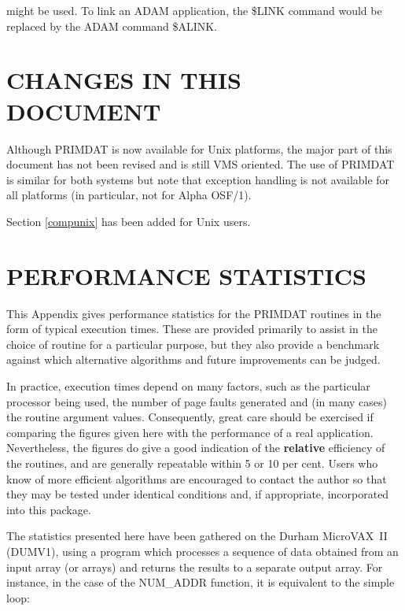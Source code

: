 \documentclass[11pt,nolof]{starlink}
\providecommand{\name}[1]{#1}
\begin{document}

might be used.
To link an \name{ADAM} application, the \name{\$LINK} command would be
replaced by the \name{ADAM} command \name{\$ALINK}.

\section{CHANGES IN THIS DOCUMENT}
Although PRIMDAT is now available for Unix platforms, the major part of this
document has not been revised and is still VMS oriented.
The use of PRIMDAT is similar for both systems but note that exception
handling is not available for all platforms (in particular, not for
Alpha OSF/1).

Section \ref{compunix} has been added for Unix users.

\appendix

\newpage

\section{PERFORMANCE STATISTICS}

\label{appendix:statistics}

This Appendix gives performance statistics for the \name{PRIMDAT} routines
in the form of typical execution times.
These are provided primarily to assist in the choice of routine for a
particular purpose, but they also provide a benchmark against which
alternative algorithms and future improvements can be judged.

In practice, execution times depend on many factors, such as the
particular processor being used, the number of page faults generated
and (in many cases) the routine argument values.
Consequently, great care should be exercised if comparing the figures given
here with the performance of a real application.
Nevertheless, the figures do give a good indication of the \textbf{relative}
efficiency of the routines, and are generally repeatable within 5 or 10 per
cent.
Users who know of more efficient algorithms are encouraged to contact the
author so that they may be tested under identical conditions and, if
appropriate, incorporated into this package.

The statistics presented here have been gathered on the Durham
\name{MicroVAX}~II (\name{DUMV1}), using a program which processes a
sequence of data obtained from an input array (or arrays) and returns the
results to a separate output array.
For instance, in the case of the \name{NUM\_ADDR} function, it is equivalent
to the simple loop:
\end{document}
